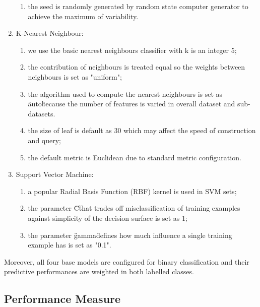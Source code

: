 \documentclass[runningheads]{llncs}
\begin{document}
\begin{enumerate}[label=\Roman*)]
\begin{enumerate}[label=\arabic*)]
		\item the seed is randomly generated by random state computer generator to achieve the maximum of variability.\\
	\end{enumerate}
	\item	  K-Nearest Neighbour: 
	\begin{enumerate}[label=\arabic*)]
		\item we use the basic nearest neighbours classifier with k is an integer 5;
		\item the contribution of neighbours is treated equal so the weights between neighbours is set as "uniform";
		\item the algorithm used to compute the nearest neighbours is set as \"auto\" because the number of features is varied in overall dataset and sub-datasets.
		\item the size of leaf is default as 30 which may affect the speed of construction and query;
		\item the default metric is Euclidean due to standard metric configuration.\\
	\end{enumerate}
	\item	  Support Vector Machine: 
	\begin{enumerate}[label=\arabic*)]
		\item a popular Radial Basis Function (RBF) kernel is used in SVM sets;
		\item the parameter \"C\" that trades off misclassification of training examples against simplicity of the decision surface is set as 1;
		\item the parameter \"gamma\" defines how much influence a single training example has is set as "0.1". 
	\end{enumerate}
\end{enumerate}
%
%
Moreover, all four base models are configured for binary classification and their predictive performances are weighted in both labelled classes. 
%
%
\subsection{Performance Measure}
\end{document}
